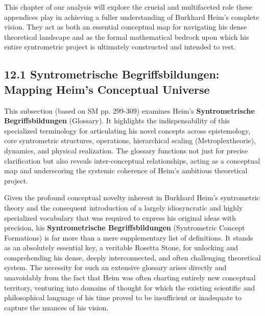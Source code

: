 \documentclass[12pt]{article}
\begin{document}
This chapter of our analysis will explore the crucial and multifaceted role these appendices play in achieving a fuller understanding of Burkhard Heim's complete vision. They act as both an essential conceptual map for navigating his dense theoretical landscape and as the formal mathematical bedrock upon which his entire syntrometric project is ultimately constructed and intended to rest.

\subsection{12.1 Syntrometrische Begriffsbildungen: Mapping Heim's Conceptual Universe}
\label{sec:begriffsbildungen}

This subsection (based on SM pp. 299-309) examines Heim's \textbf{Syntrometrische Begriffsbildungen} (Glossary). It highlights the indispensability of this specialized terminology for articulating his novel concepts across epistemology, core syntrometric structures, operations, hierarchical scaling (Metroplextheorie), dynamics, and physical realization. The glossary functions not just for precise clarification but also reveals inter-conceptual relationships, acting as a conceptual map and underscoring the systemic coherence of Heim's ambitious theoretical project.

Given the profound conceptual novelty inherent in Burkhard Heim’s syntrometric theory and the consequent introduction of a largely idiosyncratic and highly specialized vocabulary that was required to express his original ideas with precision, his \textbf{Syntrometrische Begriffsbildungen} (Syntrometric Concept Formations) is far more than a mere supplementary list of definitions. It stands as an absolutely essential key, a veritable Rosetta Stone, for unlocking and comprehending his dense, deeply interconnected, and often challenging theoretical system. The necessity for such an extensive glossary arises directly and unavoidably from the fact that Heim was often charting entirely new conceptual territory, venturing into domains of thought for which the existing scientific and philosophical language of his time proved to be insufficient or inadequate to capture the nuances of his vision.
\end{document}
